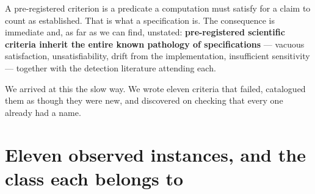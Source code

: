 \documentclass[11pt,a4paper]{article}
\begin{document}
A pre-registered criterion is a predicate a computation must satisfy for a claim to count as
established. That is what a specification is. The consequence is immediate and, as far as we
can find, unstated: \textbf{pre-registered scientific criteria inherit the entire known
pathology of specifications} --- vacuous satisfaction, unsatisfiability, drift from the
implementation, insufficient sensitivity --- together with the detection literature attending
each.

We arrived at this the slow way. We wrote eleven criteria that failed, catalogued them as
though they were new, and discovered on checking that every one already had a name.

\section{Eleven observed instances, and the class each belongs to}
\label{sec:mapping}
\end{document}

